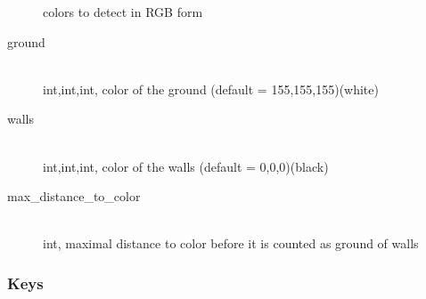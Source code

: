 \begin{description}
                colors to detect in RGB form
            \item[ground] \hfill \\ int,int,int, color of the ground 
                (default = 155,155,155)(white)
            \item[walls] \hfill \\ int,int,int, color of the walls 
                (default = 0,0,0)(black)
            \item[max\_distance\_to\_color] \hfill \\ int, maximal 
                distance to color before it is counted as ground of walls
        \end{description}

    \subsubsection{Keys}
    \label{sec:md:howto:keys}

